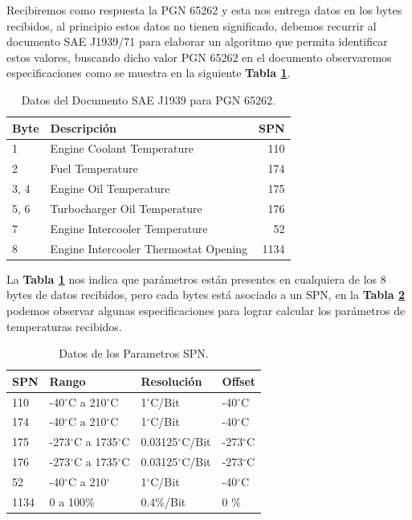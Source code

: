 Recibiremos como respuesta la PGN 65262 y esta nos entrega datos en los bytes recibidos, al principio estos datos no tienen significado, debemos recurrir al documento SAE J1939/71 para elaborar un algoritmo que permita identificar estos valores, buscando dicho valor PGN 65262 en el documento observaremos especificaciones como se muestra en la siguiente \textbf{Tabla \ref{tabla5}}.

\begin{table}[htb]
	\begin{center}
		\begin{tabular}{l l r}
			\toprule
			Byte & Descripción & SPN \\
			\midrule
			1 & Engine Coolant Temperature   & 110\\ 
			2 & Fuel Temperature  & 174\\ 
			3, 4 & Engine Oil Temperature   & 175 \\ 
			5, 6 & Turbocharger Oil Temperature & 176 \\ 
			7    & Engine Intercooler Temperature & 52  \\ 
			8    & Engine Intercooler Thermostat Opening & 1134 \\
			\bottomrule
		\end{tabular}
		\caption{Datos del Documento SAE J1939 para PGN 65262.}
		\label{tabla5}
	\end{center}
\end{table}

La \textbf{Tabla \ref{tabla5}} nos indica que parámetros están presentes en cualquiera de los 8 bytes de datos recibidos, pero cada bytes está asociado a un SPN, en la \textbf{Tabla \ref{tb_spn}} podemos observar algunas especificaciones para lograr calcular los parámetros de temperaturas recibidos. 

\begin{table}[htb]
	\begin{center}
		\begin{tabular}{ l l l l } 
			\toprule
			SPN & Rango & Resolución & Offset \\
			\midrule
			110 &-40$^{\circ}$C a 210$^{\circ}$C & 1$^{\circ}$C/Bit & -40$^{\circ}$C\\ 
			\hline
			174 &-40$^{\circ}$C a 210$^{\circ}$C & 1$^{\circ}$C/Bit & -40$^{\circ}$C\\ \hline
			175 &-273$^{\circ}$C a 1735$^{\circ}$C & 0.03125$^{\circ}$C/Bit & -273$^{\circ}$C\\ \hline
			176 &-273$^{\circ}$C a 1735$^{\circ}$C & 0.03125$^{\circ}$C/Bit & -273$^{\circ}$C\\ \hline
			52    & -40$^{\circ}$C a 210$^{\circ}$ & 1$^{\circ}$C/Bit & -40$^{\circ}$C\\ \hline
			1134   &  0 a 100\%     & 0.4\%/Bit & 0 \% \\ \hline
		\end{tabular}
		\caption{Datos de los Parametros SPN.}
		\label{tb_spn}
	\end{center}
\end{table}

